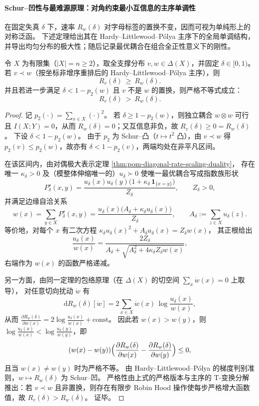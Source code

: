 
\paragraph{Schur--凹性与最难源原理：对角约束最小互信息的主序单调性}
在固定失真 \(\delta\) 下，速率 \(R_w(\delta)\) 对字母标签的置换不变，因而可视为单纯形上的对称泛函。
下述定理给出其在 Hardy--Littlewood--Pólya 主序下的全局单调结构，并导出均匀分布的极大性；随后记录最优耦合在组合全正性意义下的刚性。

\begin{theorem}\label{thm:pom-diagonal-rate-schur-concavity}
令 \(X\) 为有限集（\(|X|=n\ge 2\)），取全支撑分布 \(v,w\in\Delta(X)\)，并固定 \(\delta\in[0,1)\)。
若 \(v\prec w\)（按坐标非增序重排后的 Hardy--Littlewood--Pólya 主序），则
\[
R_v(\delta)\ \ge\ R_w(\delta).
\]
并且若进一步满足 \(\delta<1-p_2(w)\) 且 \(v\) 不是 \(w\) 的置换，则严格不等式成立：
\[
R_v(\delta)\ >\ R_w(\delta).
\]
\end{theorem}
\begin{proof}
记 \(p_2(\cdot)=\sum_{x\in X}(\cdot)^2\)。
若 \(\delta\ge 1-p_2(w)\)，则独立耦合 \(w\otimes w\) 可行且 \(I(X;Y)=0\)，从而 \(R_w(\delta)=0\)；又互信息非负，故 \(R_v(\delta)\ge 0=R_w(\delta)\)。
下设 \(\delta<1-p_2(w)\)。
由于 \(p_2\) 为 Schur--凸（\(t\mapsto t^2\) 凸），由 \(v\prec w\) 得 \(p_2(v)\le p_2(w)\)，故亦有 \(\delta<1-p_2(v)\)，两端均处在非平凡区间。
\par
在该区间内，由对偶极大表示定理 \ref{thm:pom-diagonal-rate-scaling-duality}，
存在唯一 \(\kappa_\delta>0\) 及（模整体伸缩唯一的）\(u_\delta\succ0\) 使唯一最优耦合写成指数族形状
\[
P^\star_\delta(x,y)=\frac{u_\delta(x)u_\delta(y)\bigl(1+\kappa_\delta\,\mathbf 1_{\{x=y\}}\bigr)}{Z_\delta},
\qquad Z_\delta>0,
\]
并满足边缘自洽关系
\[
w(x)=\sum_{y\in X}P^\star_\delta(x,y)=\frac{u_\delta(x)\bigl(A_\delta+\kappa_\delta u_\delta(x)\bigr)}{Z_\delta},
\qquad
A_\delta:=\sum_{z\in X}u_\delta(z).
\]
等价地，对每个 \(x\) 有二次方程
\(
\kappa_\delta u_\delta(x)^2+A_\delta u_\delta(x)=Z_\delta w(x)
\)，
其正根给出
\[
\frac{u_\delta(x)}{w(x)}
=
\frac{2Z_\delta}{A_\delta+\sqrt{A_\delta^2+4\kappa_\delta Z_\delta w(x)}},
\]
右端作为 \(w(x)\) 的函数严格递减。
\par
另一方面，由同一定理的包络原理（在 \(\Delta(X)\) 的切空间 \(\sum_x \dot w(x)=0\) 上取导），
对任意切向扰动 \(\dot w\) 有
\[
\mathrm d R_w(\delta)[\dot w]=2\sum_{x\in X}\dot w(x)\,\log\frac{u_\delta(x)}{w(x)},
\]
从而
\(
\frac{\partial R_w(\delta)}{\partial w(x)}=2\log\frac{u_\delta(x)}{w(x)}+\mathrm{const}
\)。
因此若 \(w(x)>w(y)\)，则 \(\log\frac{u_\delta(x)}{w(x)}<\log\frac{u_\delta(y)}{w(y)}\)，即
\[
(w(x)-w(y))\Bigl(\frac{\partial R_w(\delta)}{\partial w(x)}-\frac{\partial R_w(\delta)}{\partial w(y)}\Bigr)\le 0,
\]
且当 \(w(x)\ne w(y)\) 时为严格不等。
由 Hardy--Littlewood--Pólya 的梯度判别准则，\(w\mapsto R_w(\delta)\) 为 Schur--凹。
严格性由上式的严格版本与主序的 T-变换分解推出：若 \(v\prec w\) 且非置换，则存在有限步 Robin Hood 操作使每步严格增大函数值，故 \(R_v(\delta)>R_w(\delta)\)。
证毕。
\end{proof}

